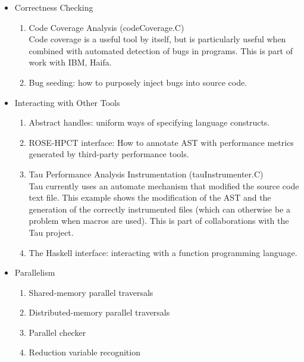 \begin{itemize}
\begin{enumerate}
\end{enumerate}
   \item{Correctness Checking}
\begin{enumerate}
     \item Code Coverage Analysis (codeCoverage.C) \\
           Code coverage is a useful tool by itself, but is particularly useful when
           combined with automated detection of bugs in programs.  This is part of
           work with IBM, Haifa.
      \item Bug seeding: how to purposely inject bugs into source code.  

\end{enumerate}
   \item{Interacting with Other Tools}
\begin{enumerate}
      \item Abstract handles: uniform ways of specifying language
      constructs.
      \item ROSE-HPCT interface: How to annotate AST with performance
      metrics generated by third-party performance tools.
     \item Tau Performance Analysis Instrumentation (tauInstrumenter.C) \\
           Tau currently uses an automate mechanism that modified the source code text
           file.  This example shows the modification of the AST and the generation 
           of the correctly instrumented files (which can otherwise be a problem when
           macros are used).  This is part of collaborations with the Tau project.
      \item The Haskell interface: interacting with a function programming
      language. 
\end{enumerate}
 \item{Parallelism}
\begin{enumerate}
  \item Shared-memory parallel traversals
  \item Distributed-memory parallel traversals
  \item Parallel checker
  \item Reduction variable recognition
\end{enumerate}

\end{itemize}

